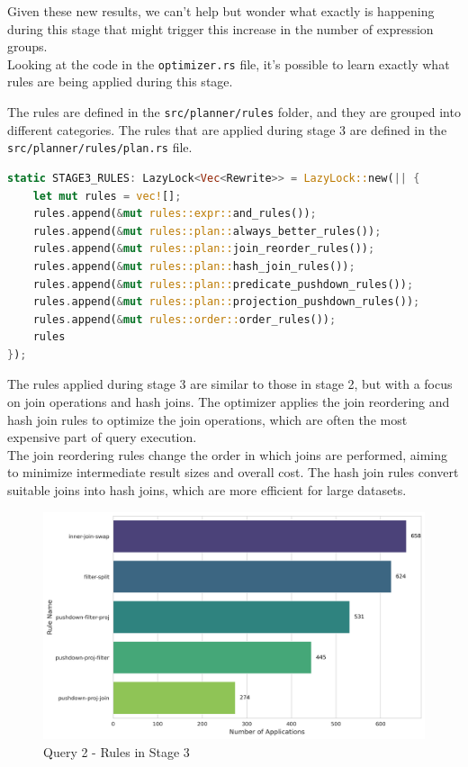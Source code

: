 \documentclass[a4paper,12pt]{scrreprt}
\begin{document}
Given these new results, we can't help but wonder what exactly is happening during this stage that might trigger this increase in the number of expression groups. \\ Looking at the code in the \texttt{optimizer.rs} file, it's possible to learn exactly what rules are being applied during this stage. 

The rules are defined in the \texttt{src/planner/rules} folder, and they are grouped into different categories. The rules that are applied during stage 3 are defined in the \texttt{src/planner/rules/plan.rs} file. 

\begin{lstlisting}[language=Rust]
static STAGE3_RULES: LazyLock<Vec<Rewrite>> = LazyLock::new(|| {
    let mut rules = vec![];
    rules.append(&mut rules::expr::and_rules());
    rules.append(&mut rules::plan::always_better_rules());
    rules.append(&mut rules::plan::join_reorder_rules());
    rules.append(&mut rules::plan::hash_join_rules());
    rules.append(&mut rules::plan::predicate_pushdown_rules());
    rules.append(&mut rules::plan::projection_pushdown_rules());
    rules.append(&mut rules::order::order_rules());
    rules
});
\end{lstlisting}

The rules applied during stage 3 are similar to those in stage 2, but with a focus on join operations and hash joins. The optimizer applies the join reordering and hash join rules to optimize the join operations, which are often the most expensive part of query execution.\\
The join reordering rules change the order in which joins are performed, aiming to minimize intermediate result sizes and overall cost. The hash join rules convert suitable joins into hash joins, which are more efficient for large datasets.


\begin{figure}[H]
    \centering
    \includegraphics[width=\linewidth]{img/img_rule_mostpop/top_5_rules_stage3_q2.png}
    \caption{Query 2 - Rules in Stage 3}
    \label{fig:rules2}
\end{figure}
\end{document}
